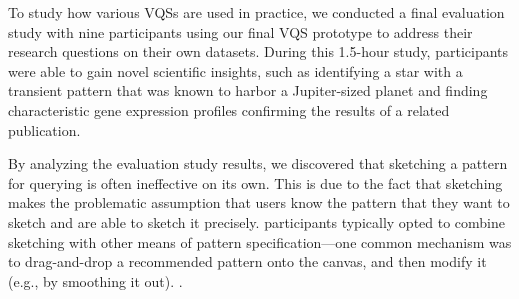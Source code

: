  \par To study how various VQSs are used in practice, we conducted a final evaluation study with nine participants using our final VQS prototype to address their research questions on their own datasets. During this 1.5-hour study, participants were able to gain novel scientific insights,
 such as identifying a star with a transient pattern that was known to harbor a Jupiter-sized planet
 and finding characteristic gene expression profiles confirming the results of a related publication. 
 \par By analyzing the evaluation study results, we discovered that sketching a pattern for querying is often ineffective on its own. This is due to the fact that sketching makes the problematic assumption that users know the pattern that they want to sketch and are able to sketch it precisely.  participants typically opted to combine sketching with other means of pattern specification---one common mechanism was to drag-and-drop a recommended pattern onto the canvas, and then modify it (e.g., by smoothing it out). . %
